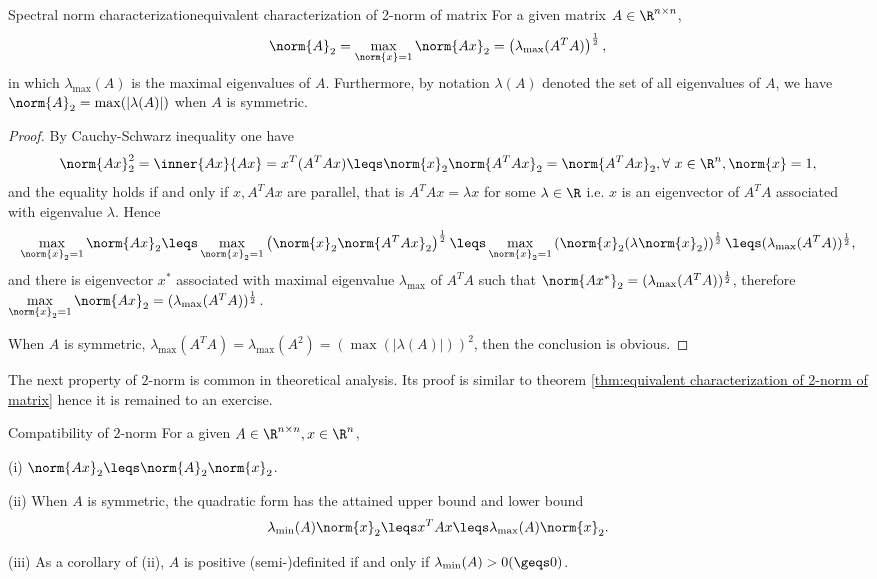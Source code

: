 \begin{theorem}{Spectral norm characterization}{equivalent characterization of 2-norm of matrix}
    For a given matrix $A\in \R^{n\times n}$,
    \begin{equation*}
        \norm{A}_2=\max_{\norm{x}=1}\norm{Ax}_2=\left(\lambda_{\max}(A^TA)\right)^{\frac{1}{2}},
    \end{equation*}
    in which $\lambda_{\max}(A)$ is the maximal eigenvalues of $A$. Furthermore, by notation $\lambda(A)$ denoted the set of all eigenvalues of $A$, we have $\norm{A}_2=\max(|\lambda(A)|)$ when $A$ is symmetric.
\end{theorem}
\begin{proof}
    By Cauchy-Schwarz inequality one have
    \begin{equation*}
        \norm{Ax}_2^2=\inner{Ax}{Ax}=x^T(A^TAx)\leqs \norm{x}_2\norm{A^TAx}_2=\norm{A^TAx}_2,\forall \ x\in \R^n,\norm{x}=1,
    \end{equation*}
    and the equality holds if and only if $x,A^TAx$ are parallel, that is $A^TAx =\lambda x$ for some $\lambda\in \R$ i.e. $x$ is an eigenvector of $A^TA$ associated with eigenvalue $\lambda$. Hence
    \begin{equation*}
        \max_{\norm{x}_2=1}\norm{Ax}_2\leqs \max_{\norm{x}_2=1}\left(\norm{x}_2\norm{A^TAx}_2\right)^{\frac{1}{2}}\leqs \max_{\norm{x}_2=1}\left(\norm{x}_2(\lambda\norm{x}_2)\right)^{\frac{1}{2}}\leqs (\lambda_{\max}(A^TA))^{\frac{1}{2}},
    \end{equation*}
    and there is eigenvector $x^*$ associated with maximal eigenvalue $\lambda_{\max}$ of $A^TA$ such that $\norm{Ax^*}_2=(\lambda_{\max}(A^TA))^{\frac{1}{2}}$, therefore $\max\limits_{\norm{x}_2=1}\norm{Ax}_2=(\lambda_{\max}(A^TA))^{\frac{1}{2}}$.

    When $A$ is symmetric, $\lambda_{\max}(A^TA)=\lambda_{\max}(A^2)=(\max(|\lambda(A)|))^2$, then the conclusion is obvious.
\end{proof}

The next property of $2$-norm is common in theoretical analysis. Its proof is similar to theorem \ref{thm:equivalent characterization of 2-norm of matrix} hence it is remained to an exercise.

\begin{corollary}{Compatibility of $2$-norm}{}
For a given $A\in \R^{n\times n},x\in \R^n$,

(i) $\norm{Ax}_2\leqs \norm{A}_2\norm{x}_2$.

(ii) When $A$ is symmetric, the quadratic form has the attained upper bound and lower bound
\begin{equation}
    \lambda_{\min}(A)\norm{x}_2\leqs x^TAx\leqs \lambda_{\max}(A)\norm{x}_2.
\end{equation}

(iii) As a corollary of (ii), $A$ is positive (semi-)definited if and only if $\lambda_{\min}(A)>0(\geqs 0)$.
\end{corollary}


